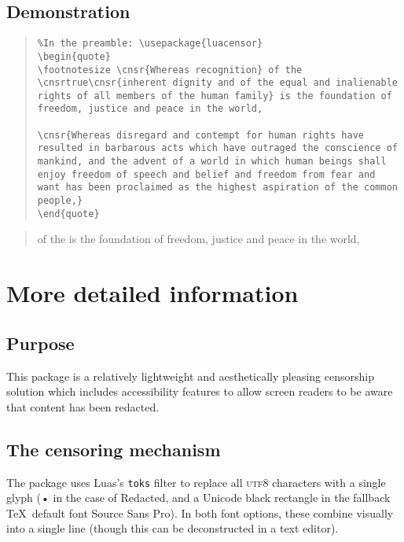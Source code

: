 \documentclass{article}
\begin{document}
 \subsection{Demonstration}
 \begin{quote}
 \begin{verbatim}
%In the preamble: \usepackage{luacensor}
\begin{quote}
\footnotesize \cnsr{Whereas recognition} of the \cnsrtrue\cnsr{inherent dignity and of the equal and inalienable rights of all members of the human family} is the foundation of freedom, justice and peace in the world,

\cnsr{Whereas disregard and contempt for human rights have resulted in barbarous acts which have outraged the conscience of mankind, and the advent of a world in which human beings shall enjoy freedom of speech and belief and freedom from fear and want has been proclaimed as the highest aspiration of the common people,}
\end{quote}
 \end{verbatim}
 \end{quote}
\begin{quote}
\footnotesize {} of the \cnsrtrue{} is the foundation of freedom, justice and peace in the world,

\end{quote} \clearpage



\section{More detailed information}
\subsection{Purpose}
This package is a relatively lightweight and aesthetically pleasing censorship solution which includes accessibility features to allow screen readers to be aware that content has been redacted.  
\subsection{The censoring mechanism}
The package uses Luas's \texttt{toks}  filter to replace all \textsc{utf8} characters with a single glyph (• in the case of Redacted, and a Unicode black rectangle in the fallback \TeX\ default font Source Sans Pro).  In both font options, these combine visually into a single line (though this can be deconstructed in a text editor).
\end{document}
